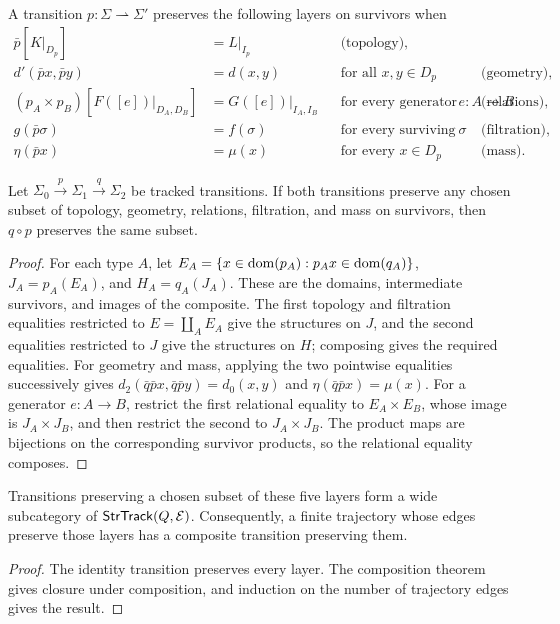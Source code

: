\begin{definition}
A transition $p:\Sigma\rightharpoonup\Sigma'$ preserves the following layers on
survivors when
\begin{align*}
\bar p[K|_{D_p}]&=L|_{I_p} &&\text{(topology)},\\
d'(\bar p x,\bar p y)&=d(x,y) &&\text{for all }x,y\in D_p &&\text{(geometry)},\\
(p_A\times p_B)[F([e])|_{D_A,D_B}]&=G([e])|_{I_A,I_B}
 &&\text{for every generator }e:A\to B &&\text{(relations)},\\
g(\bar p\sigma)&=f(\sigma)
 &&\text{for every surviving simplex }\sigma &&\text{(filtration)},\\
\eta(\bar p x)&=\mu(x)
 &&\text{for every }x\in D_p &&\text{(mass)}.
\end{align*}
\end{definition}

\begin{theorem}
Let $\Sigma_0\xrightarrow{p}\Sigma_1\xrightarrow{q}\Sigma_2$ be tracked
transitions. If both transitions preserve any chosen subset of topology,
geometry, relations, filtration, and mass on survivors, then $q\circ p$
preserves the same subset.
\end{theorem}

\begin{proof}
For each type $A$, let
$E_A=\{x\in\operatorname{dom}(p_A):p_Ax\in\operatorname{dom}(q_A)\}$,
$J_A=p_A(E_A)$, and $H_A=q_A(J_A)$. These are the domains, intermediate
survivors, and images of the composite. The first topology and filtration
equalities restricted to $E=\coprod_AE_A$ give the structures on $J$, and the
second equalities restricted to $J$ give the structures on $H$; composing gives
the required equalities. For geometry and mass, applying the two pointwise
equalities successively gives
$d_2(\bar q\bar p x,\bar q\bar p y)=d_0(x,y)$ and
$\eta(\bar q\bar p x)=\mu(x)$. For a generator $e:A\to B$, restrict the first
relational equality to $E_A\times E_B$, whose image is $J_A\times J_B$, and
then restrict the second to $J_A\times J_B$. The product maps are bijections on
the corresponding survivor products, so the relational equality composes.
\end{proof}

\begin{corollary}
Transitions preserving a chosen subset of these five layers form a wide
subcategory of $\mathsf{StrTrack}(Q,\mathcal E)$. Consequently, a finite trajectory whose
edges preserve those layers has a composite transition preserving them.
\end{corollary}

\begin{proof}
The identity transition preserves every layer. The composition theorem gives
closure under composition, and induction on the number of trajectory edges
gives the result.
\end{proof}
